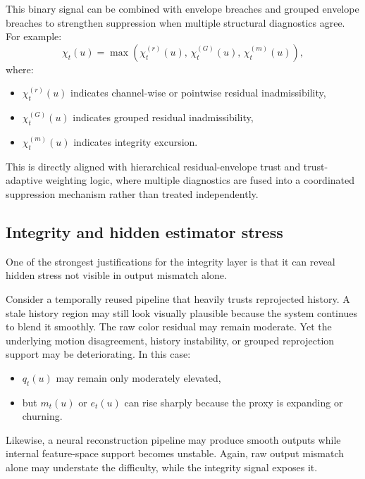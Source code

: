 \documentclass[11pt]{article}
\theoremstyle{definition}
\theoremstyle{plain}
\begin{document}
This binary signal can be combined with envelope breaches and grouped envelope breaches to strengthen suppression when multiple structural diagnostics agree. For example:
\begin{equation}
\chi_t(u)=
\max\!\left(
\chi^{(r)}_t(u),\,
\chi^{(G)}_t(u),\,
\chi^{(m)}_t(u)
\right),
\end{equation}
where:
\begin{itemize}[leftmargin=1.5em]
    \item $\chi^{(r)}_t(u)$ indicates channel-wise or pointwise residual inadmissibility,
    \item $\chi^{(G)}_t(u)$ indicates grouped residual inadmissibility,
    \item $\chi^{(m)}_t(u)$ indicates integrity excursion.
\end{itemize}

This is directly aligned with hierarchical residual-envelope trust and trust-adaptive weighting logic, where multiple diagnostics are fused into a coordinated suppression mechanism rather than treated independently. 


\subsection{Integrity and hidden estimator stress}

One of the strongest justifications for the integrity layer is that it can reveal hidden stress not visible in output mismatch alone.

Consider a temporally reused pipeline that heavily trusts reprojected history. A stale history region may still look visually plausible because the system continues to blend it smoothly. The raw color residual may remain moderate. Yet the underlying motion disagreement, history instability, or grouped reprojection support may be deteriorating. In this case:
\begin{itemize}[leftmargin=1.5em]
    \item $q_t(u)$ may remain only moderately elevated,
    \item but $m_t(u)$ or $e_t(u)$ can rise sharply because the proxy is expanding or churning.
\end{itemize}

Likewise, a neural reconstruction pipeline may produce smooth outputs while internal feature-space support becomes unstable. Again, raw output mismatch alone may understate the difficulty, while the integrity signal exposes it.
\end{document}
